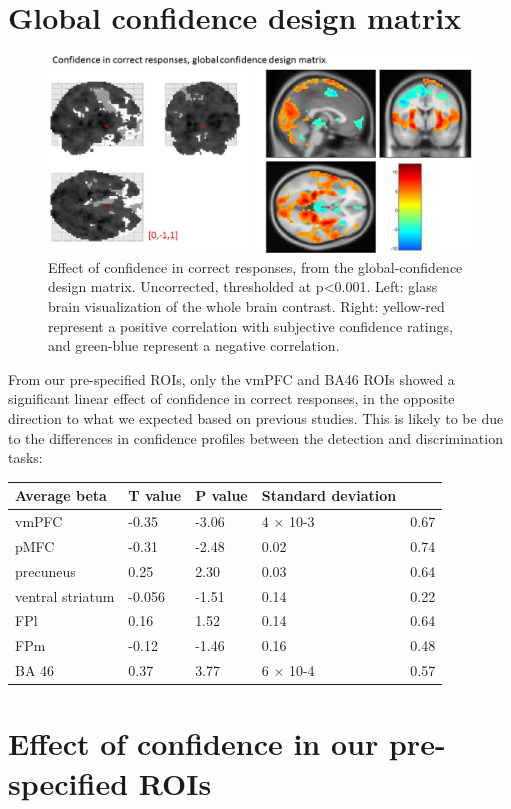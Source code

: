 \documentclass[12pt,twoside]{reedthesis}
\begin{document}
\hypertarget{app3-GC-DM}{%
\section{Global confidence design matrix}\label{app3-GC-DM}}
\begin{figure}[H]
\includegraphics[width=\linewidth]{figure/fMRI/GC-DM} \caption[Parametric effect of confidence in correct responses]{Effect of confidence in correct responses, from the global-confidence design matrix. Uncorrected, thresholded at p<0.001. Left: glass brain visualization of the whole brain contrast. Right: yellow-red represent a positive correlation with subjective confidence ratings, and green-blue represent a negative correlation.}\label{fig:GC-DM}
\end{figure}
From our pre-specified ROIs, only the vmPFC and BA46 ROIs showed a significant linear effect of confidence in correct responses, in the opposite direction to what we expected based on previous studies. This is likely to be due to the differences in confidence profiles between the detection and discrimination tasks:
\begin{longtable}[]{@{}lllll@{}}
\toprule
Average beta & T value & P value & Standard deviation & \\
\midrule
\endhead
vmPFC & -0.35 & -3.06 & 4 × 10-3 & 0.67 \\
pMFC & -0.31 & -2.48 & 0.02 & 0.74 \\
precuneus & 0.25 & 2.30 & 0.03 & 0.64 \\
ventral striatum & -0.056 & -1.51 & 0.14 & 0.22 \\
FPl & 0.16 & 1.52 & 0.14 & 0.64 \\
FPm & -0.12 & -1.46 & 0.16 & 0.48 \\
BA 46 & 0.37 & 3.77 & 6 × 10-4 & 0.57 \\
\bottomrule
\end{longtable}
\hypertarget{app3-ROIconf}{%
\section{Effect of confidence in our pre-specified ROIs}\label{app3-ROIconf}}
\end{document}
